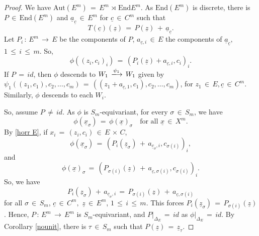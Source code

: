 \documentclass[10pt,a4paper]{amsart}
\theoremstyle{plain}
\theoremstyle{definition}
\theoremstyle{remark}
\begin{document}
\begin{proof}
We have $\textrm{Aut}(E^{m})\,=\, E^{m}\,\rtimes\,\textrm{End}E^{m}$. As $\textrm{End}(E^{m})$ is discrete, there is $P\,\in\, \textrm{End}(E^{m})$ and  $\underline{a}_{\underline{c}}\,\in\, E^{m}$ for $\underline{c}\,\in\, C^{m}$ such that 
\begin{equation*}
T(\underline{c})(\underline{z})\,=\, P(\underline{z})\,+\, \underline{a}_{\underline{c}}.  
\end{equation*}
Let $P_{i}\,:\,E^{m}\,\longrightarrow\, E$ be the components of $P$, $a_{\underline{c},i}\,\in\, E$ the components of $\underline{a}_{\underline{c}},$ $1\,\leq\,i\,\leq\,m$. So, 
\begin{equation}\label{horr E}
\phi((z_{i},c_{i})_{i})\,=\, (P_{i}(\underline{z})+a_{\underline{c},i},c_{i})_{i}.    
\end{equation}
If $P\,=\,{id}$, then $\phi$ descends to $W_{1}\,\xlongrightarrow{\psi_{1}}\,W_{1}$ given by $\psi_{1}((z_{1},c_{1}), c_{2},\ldots,c_{m})\,=\, ((z_{1}+a_{\underline{c},1},c_{1}),c_{2},\ldots,c_{m})$, for $z_{1}\,\in\, E, \underline{c}\,\in\, C^{m}$. Similarly, $\phi$ descends to each $W_{i}$. 

So, assume $P\,\neq\,{id}$. As $\phi$ is $S_m$-equivariant, for every $\sigma\,\in\,S_{m}$, we have 
\begin{equation*}
\phi(\underline{x}_{\sigma})\,=\, \phi(\underline{x})_{\sigma} \quad \textrm{for all}\,\, \underline{x}\,\in\, X^{m}.
\end{equation*}
By \eqref{horr E}, if $x_{i}\,=\, (z_{i},c_{i})\,\in\, E\,\times\,C$,
\begin{equation*}
\phi(\underline{x}_{\sigma})\,=\, (P_{i}(\underline{z}_{\sigma})\,+\, a_{\underline{c}_{\sigma},i}, c_{\sigma(i)})_{i},    
\end{equation*}
and
\begin{equation*}
\phi(\underline{x})_{\sigma}\,=\, (P_{\sigma(i)}(\underline{z})\,+\, a_{\underline{c},\sigma(i)}, c_{\sigma(i)} )_{i}.   
\end{equation*}
 So, we have
\begin{equation*}
P_{i}(\underline{z}_{\sigma})\,+\, a_{\underline{c}_{\sigma},i}\,=\, P_{\sigma(i)}(\underline{z})\,+\, a_{\underline{c}, \sigma(i)} 
\end{equation*}
for all $\sigma\,\in\, S_{m}$, $\underline{c}\,\in\, C^{m},$ $ \underline{z}\,\in\, E^{m}$, $1\,\leq\,i\,\leq\, m$. This forces
$P_{i}(\underline{z}_{\sigma})\,=\, P_{\sigma(i)}(\underline{z})$. Hence, $P\,:\, E^{m}\,\longrightarrow\, E^{m}$ is $S_{m}$-equivariant, and $P|_{\Delta_{E}}\,=\,{id}$ as $\phi{|_{\Delta_{E}}}\,=\,{id}$. By Corollary \ref{nounit}, there is $\tau\,\in\, S_{m}$ such that $P(\underline{z})\,=\, \underline{z}_{\tau}$.


\end{proof}
\end{document}
